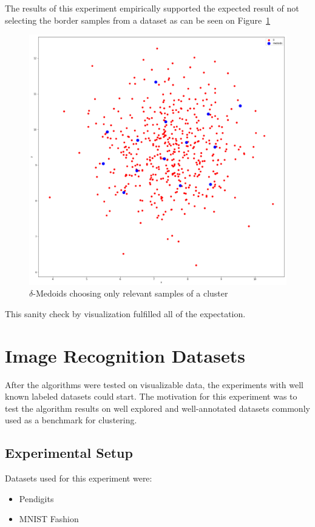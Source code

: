 \documentclass[thesis=B,english]{FITthesis}[2012/10/20]
\begin{document}
The results of this experiment empirically supported the expected result of not selecting the border samples from a dataset as can be seen on Figure~\ref{img:blobs_good_select}
\begin{figure}[H]
  \includegraphics[width=\linewidth]{img/delta_medoids_select_better.png}
  \caption{$\delta$-Medoids choosing only relevant samples of a cluster}
  \label{img:blobs_good_select}
\end{figure}
This sanity check by visualization fulfilled all of the expectation.

\section{Image Recognition Datasets}\label{sec:exp3}

After the algorithms were tested on visualizable data, the experiments with well known labeled datasets could start.
The motivation for this experiment was to test the algorithm results on well explored and well-annotated datasets commonly used as a benchmark for clustering.

\subsection{Experimental Setup}
Datasets used for this experiment were:
\begin{itemize}
    \item Pendigits
    \item MNIST Fashion
\end{itemize}
\end{document}
